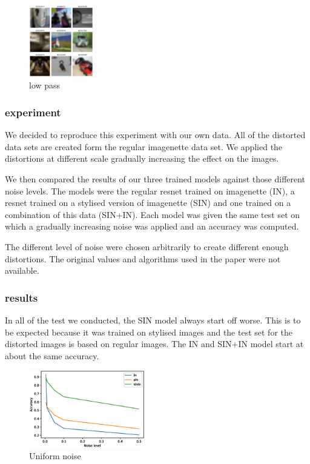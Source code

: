 \documentclass{article}
\begin{document}
\begin{figure}[h!]
\centering
\includegraphics[width = 0.25\textwidth]{imgs/image_low}
\caption{low pass}

\end{figure}

\subsubsection{experiment}

We decided to reproduce this experiment with our own data.
All of the distorted data sets are created form the regular imagenette data set. We applied the distortions at different scale gradually increasing the effect on the images.

We then compared the results of our three trained models against those different noise levels.
The models were the regular resnet trained on imagenette (IN), a resnet trained on a stylised version of imagenette (SIN) and one trained on a combination of this data (SIN+IN).
Each model was given the same test set on which a gradually increasing noise was applied and an accuracy was computed.

The different level of noise were chosen arbitrarily to create different enough distortions. The original values and algorithms used in the paper were not available.

\subsubsection{results}

In all of the test we conducted, the SIN model always start off worse. This is to be expected because it was trained on stylised images and the test set for the distorted images is based on regular images. The IN and SIN+IN model start at about the same accuracy.

\begin{figure}[h!]
\centering
\includegraphics[width = 0.45\textwidth]{imgs/uniform}
\caption{Uniform noise}
\end{figure}
\end{document}
